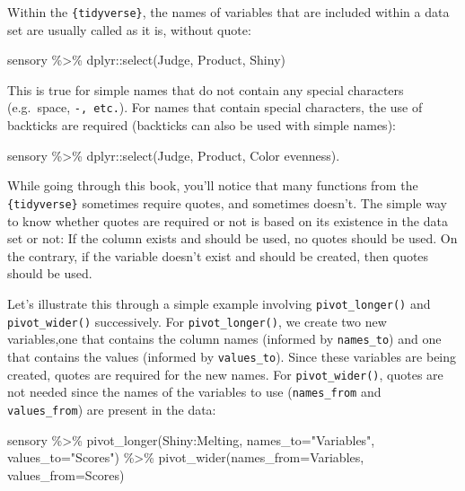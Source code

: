 \documentclass[
]{book}
\newenvironment{Shaded}{\begin{snugshade}}{\end{snugshade}}
\newcommand{\AttributeTok}[1]{\textcolor[rgb]{0.77,0.63,0.00}{#1}}
\newcommand{\FunctionTok}[1]{\textcolor[rgb]{0.00,0.00,0.00}{#1}}
\newcommand{\NormalTok}[1]{#1}
\newcommand{\SpecialCharTok}[1]{\textcolor[rgb]{0.00,0.00,0.00}{#1}}
\newcommand{\StringTok}[1]{\textcolor[rgb]{0.31,0.60,0.02}{#1}}
\begin{document}
Within the \texttt{\{tidyverse\}}, the names of variables that are included within a data set are usually called as it is, without quote:

\begin{Shaded}
\begin{Highlighting}[]
\NormalTok{sensory }\SpecialCharTok{\%\textgreater{}\%} 
\NormalTok{  dplyr}\SpecialCharTok{::}\FunctionTok{select}\NormalTok{(Judge, Product, Shiny)}
\end{Highlighting}
\end{Shaded}

This is true for simple names that do not contain any special characters (e.g.~space, \texttt{-,\ etc.}). For names that contain special characters, the use of backticks are required (backticks can also be used with simple names):

\begin{Shaded}
\begin{Highlighting}[]
\NormalTok{sensory }\SpecialCharTok{\%\textgreater{}\%} 
\NormalTok{  dplyr}\SpecialCharTok{::}\FunctionTok{select}\NormalTok{(}\StringTok{\textasciigrave{}}\AttributeTok{Judge}\StringTok{\textasciigrave{}}\NormalTok{, Product, }\StringTok{\textasciigrave{}}\AttributeTok{Color evenness}\StringTok{\textasciigrave{}}\NormalTok{).}
\end{Highlighting}
\end{Shaded}

While going through this book, you'll notice that many functions from the \texttt{\{tidyverse\}} sometimes require quotes, and sometimes doesn't. The simple way to know whether quotes are required or not is based on its existence in the data set or not: If the column exists and should be used, no quotes should be used. On the contrary, if the variable doesn't exist and should be created, then quotes should be used.

Let's illustrate this through a simple example involving \texttt{pivot\_longer()} and \texttt{pivot\_wider()} successively. For \texttt{pivot\_longer()}, we create two new variables,one that contains the column names (informed by \texttt{names\_to}) and one that contains the values (informed by \texttt{values\_to}). Since these variables are being created, quotes are required for the new names. For \texttt{pivot\_wider()}, quotes are not needed since the names of the variables to use (\texttt{names\_from} and \texttt{values\_from}) are present in the data:

\begin{Shaded}
\begin{Highlighting}[]
\NormalTok{sensory }\SpecialCharTok{\%\textgreater{}\%} 
  \FunctionTok{pivot\_longer}\NormalTok{(Shiny}\SpecialCharTok{:}\NormalTok{Melting, }\AttributeTok{names\_to=}\StringTok{"Variables"}\NormalTok{, }\AttributeTok{values\_to=}\StringTok{"Scores"}\NormalTok{) }\SpecialCharTok{\%\textgreater{}\%} 
  \FunctionTok{pivot\_wider}\NormalTok{(}\AttributeTok{names\_from=}\NormalTok{Variables, }\AttributeTok{values\_from=}\NormalTok{Scores)}
\end{Highlighting}
\end{Shaded}
\end{document}
